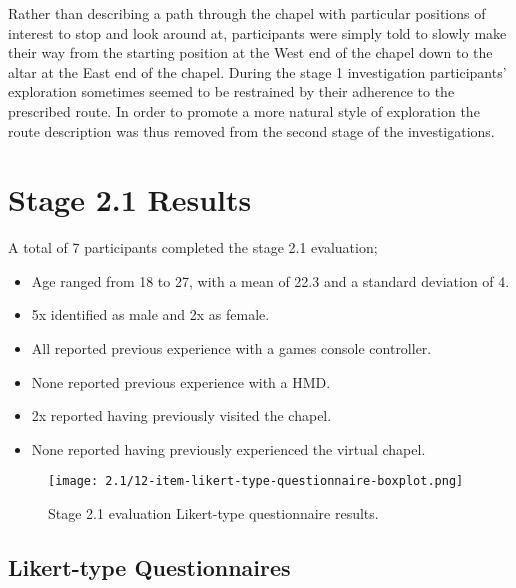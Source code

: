 Rather than describing a path through the chapel with particular positions of interest to stop and look around at, participants were simply told to slowly make their way from the starting position at the West end of the chapel down to the altar at the East end of the chapel. During the stage 1 investigation participants' exploration sometimes seemed to be restrained by their adherence to the prescribed route. In order to promote a more natural style of exploration the route description was thus removed from the second stage of the investigations.


\section{Stage 2.1 Results}

A total of 7 participants completed the stage 2.1 evaluation;
\begin{itemize}
	\item Age ranged from 18 to 27, with a mean of 22.3 and a standard deviation of 4.
	\item 5x identified as male and 2x as female.
	\item All reported previous experience with a games console controller.
	\item None reported previous experience with a HMD.
	\item 2x reported having previously visited the chapel.
	\item None reported having previously experienced the virtual chapel.
\end{itemize}


\begin{figure}[h]
	\begin{center}
	\texttt{[image: 2.1/12-item-likert-type-questionnaire-boxplot.png]}
	\caption{Stage 2.1 evaluation Likert-type questionnaire results.}
	\label{2-1-12-item-likert-type-questionnaire-boxplot.png}
	\end{center}
\end{figure}


\subsection{Likert-type Questionnaires}

